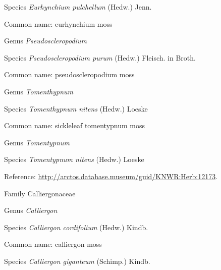 \documentclass[9pt, article]{memoir}
\begin{document}
\begin{multicols}{2}
\vspace{6pt}\noindent\hspace{36pt}Species \textit{Eurhynchium pulchellum} (Hedw.) Jenn.


Common name: eurhynchium moss

\vspace{6pt}\noindent\hspace{30pt}Genus \textit{Pseudoscleropodium}


\vspace{6pt}\noindent\hspace{36pt}Species \textit{Pseudoscleropodium purum} (Hedw.) Fleisch. in Broth.


Common name: pseudoscleropodium moss

\vspace{6pt}\noindent\hspace{30pt}Genus \textit{Tomenthypnum}


\vspace{6pt}\noindent\hspace{36pt}Species \textit{Tomenthypnum nitens} (Hedw.) Loeske


Common name: sickleleaf tomentypnum moss

\vspace{6pt}\noindent\hspace{30pt}Genus \textit{Tomentypnum}


\vspace{6pt}\noindent\hspace{36pt}Species \textit{Tomentypnum nitens} (Hedw.) Loeske


Reference: 
\url{http://arctos.database.museum/guid/KNWR:Herb:12173}.

\vspace{6pt}\noindent\hspace{24pt}Family Calliergonaceae


\vspace{6pt}\noindent\hspace{30pt}Genus \textit{Calliergon}


\vspace{6pt}\noindent\hspace{36pt}Species \textit{Calliergon cordifolium} (Hedw.) Kindb.


Common name: calliergon moss

\vspace{6pt}\noindent\hspace{36pt}Species \textit{Calliergon giganteum} (Schimp.) Kindb.



\end{multicols}
\end{document}
